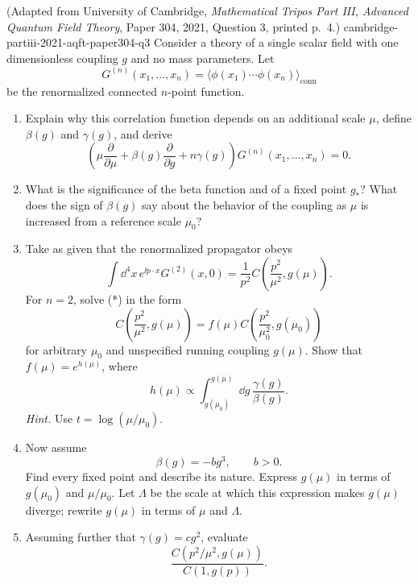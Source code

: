 \begin{enumerate}
  {(Adapted from University of Cambridge, \emph{Mathematical Tripos Part III,
  Advanced Quantum Field Theory}, Paper 304, 2021, Question 3, printed
  p.~4.)}
  {cambridge-partiii-2021-aqft-paper304-q3}
Consider a theory of a single scalar field with one dimensionless coupling
\(g\) and no mass parameters.  Let
\[
 G^{(n)}(x_1,\ldots,x_n)
 =\langle\phi(x_1)\cdots\phi(x_n)\rangle_{\mathrm{conn}}
\]
be the renormalized connected \(n\)-point function.
\begin{enumerate}
\item
Explain why this correlation function depends on an additional scale
\(\mu\), define \(\beta(g)\) and \(\gamma(g)\), and derive
\[
 \left(\mu\frac{\partial}{\partial\mu}
 +\beta(g)\frac{\partial}{\partial g}+n\gamma(g)\right)
 G^{(n)}(x_1,\ldots,x_n)=0.
\tag{*}
\]
\item
What is the significance of the beta function and of a fixed point
\(g_*\)?  What does the sign of \(\beta(g)\) say about the behavior of the
coupling as \(\mu\) is increased from a reference scale \(\mu_0\)?
\item
Take as given that the renormalized propagator obeys
\[
 \int \dd^4x\,e^{\ii p\cdot x}G^{(2)}(x,0)
 =\frac1{p^2}C\!\left(\frac{p^2}{\mu^2},g(\mu)\right).
\]
For \(n=2\), solve (*) in the form
\[
 C\!\left(\frac{p^2}{\mu^2},g(\mu)\right)
 =f(\mu)
 C\!\left(\frac{p^2}{\mu_0^2},g(\mu_0)\right)
\]
for arbitrary \(\mu_0\) and unspecified running coupling \(g(\mu)\).
Show that \(f(\mu)=e^{h(\mu)}\), where
\[
 h(\mu)\propto\int_{g(\mu_0)}^{g(\mu)}\dd g\,
 \frac{\gamma(g)}{\beta(g)}.
\]
\emph{Hint.}  Use \(t=\log(\mu/\mu_0)\).
\item
Now assume
\[
 \beta(g)=-bg^3,
 \qquad b>0.
\]
Find every fixed point and describe its nature.  Express \(g(\mu)\) in
terms of \(g(\mu_0)\) and \(\mu/\mu_0\).  Let \(\Lambda\) be the scale at
which this expression makes \(g(\mu)\) diverge; rewrite \(g(\mu)\) in
terms of \(\mu\) and \(\Lambda\).
\item
Assuming further that \(\gamma(g)=cg^2\), evaluate
\[
 \frac{C(p^2/\mu^2,g(\mu))}{C(1,g(p))}.
\]
\end{enumerate}
\end{enumerate}
